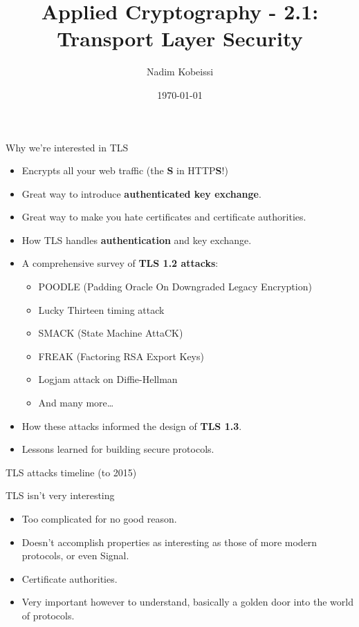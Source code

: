 \documentclass[aspectratio=169, lualatex, handout]{beamer}
\title{Applied Cryptography - 2.1: Transport Layer Security}
\author{Nadim Kobeissi}
\institute{American University of Beirut}
\date{\today}
\begin{document}
\begin{frame}[plain]
	\titlepage
\end{frame}

\begin{frame}{Why we're interested in TLS}
	\begin{itemize}[<+->]
		\item Encrypts all your web traffic (the \textbf{S} in HTTP\textbf{S}!)
		\item Great way to introduce \textbf{authenticated key exchange}.
		\item Great way to make you hate certificates and certificate authorities.
		\item How TLS handles \textbf{authentication} and key exchange.
		\item A comprehensive survey of \textbf{TLS 1.2 attacks}:
		      \begin{itemize}
			      \item POODLE (Padding Oracle On Downgraded Legacy Encryption)
			      \item Lucky Thirteen timing attack
			      \item SMACK (State Machine AttaCK)
			      \item FREAK (Factoring RSA Export Keys)
			      \item Logjam attack on Diffie-Hellman
			      \item And many more\ldots
		      \end{itemize}
		\item How these attacks informed the design of \textbf{TLS 1.3}.
		\item Lessons learned for building secure protocols.
	\end{itemize}
\end{frame}

\begin{frame}{TLS attacks timeline (to 2015)}
\end{frame}

\begin{frame}{TLS isn't very interesting}
	\begin{itemize}
		\item Too complicated for no good reason.
		\item Doesn't accomplish properties as interesting as those of more modern protocols, or even Signal.
		\item Certificate authorities.
		\item Very important however to understand, basically a golden door into the world of protocols.
	\end{itemize}
\end{frame}
\end{document}
